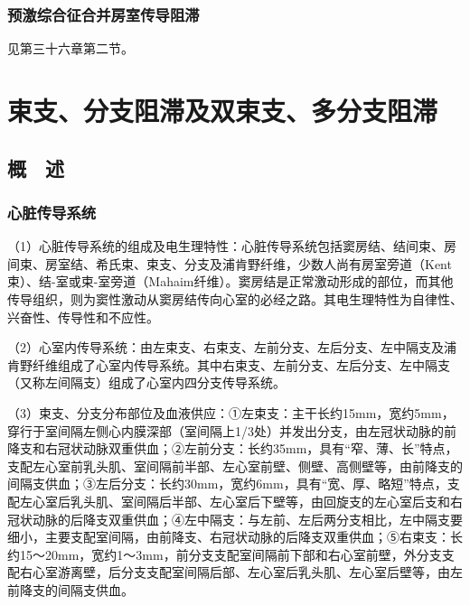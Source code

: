 \subsection{预激综合征合并房室传导阻滞}

见第三十六章第二节。

\protect\hypertarget{text00028.html}{}{}

\protect\hypertarget{text00028.htmlux5cux23chapter28}{}{}

\chapter{束支、分支阻滞及双束支、多分支阻滞}

\protect\hypertarget{text00028.htmlux5cux23subid339}{}{}

\section{概　述}

\protect\hypertarget{text00028.htmlux5cux23subid340}{}{}

\subsection{心脏传导系统}

（1）心脏传导系统的组成及电生理特性：心脏传导系统包括窦房结、结间束、房间束、房室结、希氏束、束支、分支及浦肯野纤维，少数人尚有房室旁道（Kent束）、结-室或束-室旁道（Mahaim纤维）。窦房结是正常激动形成的部位，而其他传导组织，则为窦性激动从窦房结传向心室的必经之路。其电生理特性为自律性、兴奋性、传导性和不应性。

（2）心室内传导系统：由左束支、右束支、左前分支、左后分支、左中隔支及浦肯野纤维组成了心室内传导系统。其中右束支、左前分支、左后分支、左中隔支（又称左间隔支）组成了心室内四分支传导系统。

（3）束支、分支分布部位及血液供应：①左束支：主干长约15mm，宽约5mm，穿行于室间隔左侧心内膜深部（室间隔上1/3处）并发出分支，由左冠状动脉的前降支和右冠状动脉双重供血；②左前分支：长约35mm，具有“窄、薄、长”特点，支配左心室前乳头肌、室间隔前半部、左心室前壁、侧壁、高侧壁等，由前降支的间隔支供血；③左后分支：长约30mm，宽约6mm，具有“宽、厚、略短”特点，支配左心室后乳头肌、室间隔后半部、左心室后下壁等，由回旋支的左心室后支和右冠状动脉的后降支双重供血；④左中隔支：与左前、左后两分支相比，左中隔支要细小，主要支配室间隔，由前降支、右冠状动脉的后降支双重供血；⑤右束支：长约15～20mm，宽约1～3mm，前分支支配室间隔前下部和右心室前壁，外分支支配右心室游离壁，后分支支配室间隔后部、左心室后乳头肌、左心室后壁等，由左前降支的间隔支供血。

